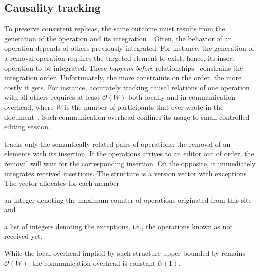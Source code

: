 


\subsection{Causality tracking}
\label{subsec:causality}

To preserve consistent replicas, the same outcome must results from the
generation of the operation and its integration~\cite{sun1998achieving}. Often,
the behavior of an operation depends of others previously integrated. For
instance, the generation of a removal operation requires the targeted element to
exist, hence, its insert operation to be integrated. These \emph{happens before}
relationships~\cite{lamport1978time} constrains the integration order.
Unfortunately, the more constraints on the order, the more costly it gets. For
instance, accurately tracking causal relations of one operation with all others
requires at least $\mathcal{O}(W)$ both locally and in communication overhead,
where $W$ is the number of participants that ever wrote in the
document~\cite{charronbost1991concerning}. Such communication overhead confines
its usage to small controlled editing session.

\CRATE tracks only the semantically related pairs of operations: the removal of
an elements with its insertion. If the operations arrives to an editor out of
order, the removal will wait for the corresponding insertion. On the opposite,
it immediately integrates received insertions. The structure is a version vector
with exceptions~\cite{malkhi2007concise, mukund2014optimized}. The vector
allocates for each member
\begin{inparaenum}[(i)]
\item an integer denoting the maximum counter of operations originated from
  this site and
\item a list of integers denoting the exceptions, i.e., the operations known
  as not received yet.
\end{inparaenum}
While the local overhead implied by such structure upper-bounded by remains
$\mathcal{O}(W)$, the communication overhead is constant $\mathcal{O}(1)$.

